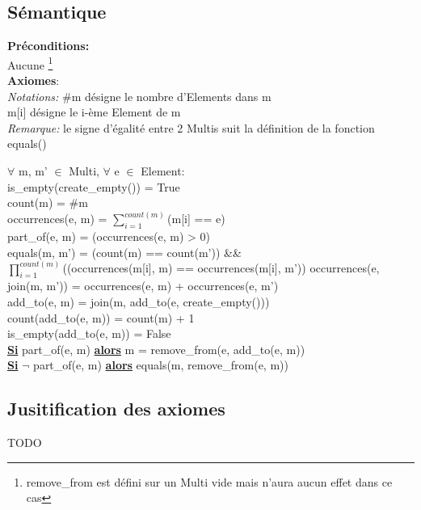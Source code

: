 \documentclass[a4paper, 11pt, oneside]{article}
\begin{document}
	\subsection{Sémantique}
	\noindent \textbf{Préconditions:}
	\\ \indent Aucune \footnote{remove\_from est défini sur un Multi vide mais n'aura aucun effet dans ce cas}
	\\ \textbf{Axiomes}:
	\\ \indent \textit{Notations:} \#m désigne le nombre d'Elements dans m 
	\\ \indent \indent \indent \indent \indent m[i] désigne le i-ème Element de m
	\\ \indent \textit{Remarque:} le signe d'égalité entre 2 Multis suit la définition de la fonction equals()
	\begin{spacing}{1.5}
	\indent $\forall$ m, m' $\in$ Multi, $\forall$ e $\in$ Element:
	\\ \indent \indent is\_empty(create\_empty()) = True
	\\ \indent \indent count(m) = \#m
	\\ \indent \indent occurrences(e, m) = $\sum\limits_{i=1}^{count(m)}$(m[i] == e)
	\\ \indent \indent part\_of(e, m) = (occurrences(e, m) > 0)
	\\ \indent \indent equals(m, m') = (count(m) == count(m')) \&\& 
	\\ \indent \indent \indent \indent $\prod\limits_{i=1}^{count(m)}$((occurrences(m[i], m) == occurrences(m[i], m'))
	\clearpage
	\indent \indent occurrences(e, join(m, m')) = occurrences(e, m) + occurrences(e, m')
	\\ \indent \indent add\_to(e, m) = join(m, add\_to(e, create\_empty()))
	\\ \indent \indent count(add\_to(e, m)) = count(m) + 1
	\\ \indent \indent is\_empty(add\_to(e, m)) = False	
	\\ \indent \indent \textbf{\underline{Si}} part\_of(e, m) \textbf{\underline{alors}} m = remove\_from(e, add\_to(e, m))
	\\ \indent \indent \textbf{\underline{Si}} $\neg$ part\_of(e, m) \textbf{\underline{alors}} equals(m, remove\_from(e, m))
	\end{spacing}
	
	\subsection{Jusitification des axiomes}
	\color{blue} TODO \color{black}
	
\end{document}
